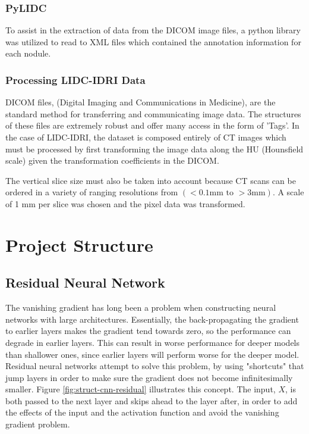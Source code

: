\documentclass[10pt,twocolumn,letterpaper]{article}
\begin{document}
      \subsubsection{PyLIDC} \label{sec:data-lidc-pylidc}
         To assist in the extraction of data from the DICOM image files, a python library was utilized
         to read to XML files which contained the annotation information for each nodule. \cite{Hancock2018}
    
      \subsubsection{Processing LIDC-IDRI Data} \label{sec:data-lidc-processing}
         DICOM files, (Digital Imaging and Communications in Medicine), are the standard method for transferring
         and communicating image data. The structures of these files are extremely robust and offer many access in
         the form of 'Tags'. In the case of LIDC-IDRI, the dataset is composed entirely of CT images which must be
         processed by first transforming the image data along the HU (Hounsfield scale) given the transformation
         coefficients in the DICOM.
    
         The vertical slice size must also be taken into account because CT scans can be ordered in a variety of
         ranging resolutions from $(<0.1\text{mm to } >3 \text{mm})$. A scale of 1 mm per slice was chosen and the
         pixel data was transformed.

\section{Project Structure} \label{sec:struct}

   \subsection{Residual Neural Network} \label{sec:struct-cnn}
        The vanishing gradient has long been a problem when constructing neural networks with large architectures. Essentially, the back-propagating the gradient to earlier layers makes the gradient tend towards zero, so the performance can degrade in earlier layers. This can result in worse performance for deeper models than shallower ones, since earlier layers will perform worse for the deeper model. Residual neural networks attempt to solve this problem, by using "shortcuts" that jump layers in order to make sure the gradient does not become infinitesimally smaller. Figure \ref{fig:struct-cnn-residual} illustrates this concept. The input, $X$, is both passed to the next layer and skips ahead to the layer after, in order to add the effects of the input and the activation function and avoid the vanishing gradient problem.
\end{document}
